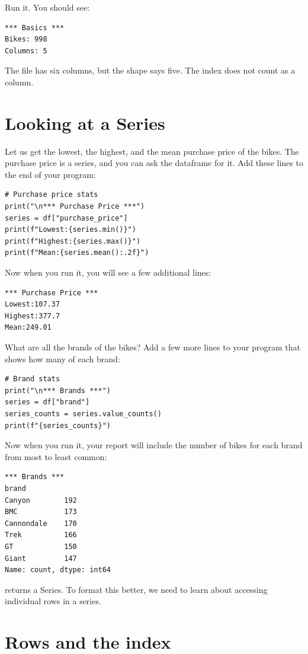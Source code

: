 Run it. You should see:
\begin{verbatim}
*** Basics ***
Bikes: 998
Columns: 5
\end{verbatim}

The file has six columns, but the shape says five. The index does not
count as a column.

\section{Looking at a Series}

Let us get the lowest, the highest, and the mean purchase price of the
bikes.  The purchase price is a series, and you can ask the dataframe
for it. Add these lines to the end of your program:

\begin{verbatim}
# Purchase price stats
print("\n*** Purchase Price ***")
series = df["purchase_price"]
print(f"Lowest:{series.min()}")
print(f"Highest:{series.max()}")
print(f"Mean:{series.mean():.2f}")
\end{verbatim}

Now when you run it, you will see a few additional lines:
\begin{verbatim}
*** Purchase Price ***
Lowest:107.37
Highest:377.7
Mean:249.01
\end{verbatim}

What are all the brands of the bikes? Add a few more lines to your
program that shows how many of each brand:

\begin{verbatim}
# Brand stats
print("\n*** Brands ***")
series = df["brand"]
series_counts = series.value_counts()
print(f"{series_counts}")
\end{verbatim}

Now when you run it, your report will include the number of bikes for
each brand from most to least common:

\begin{verbatim}
*** Brands ***
brand
Canyon        192
BMC           173
Cannondale    170
Trek          166
GT            150
Giant         147
Name: count, dtype: int64
\end{verbatim}

 returns a Series.  To format this better, we
need to learn about accessing individual rows in a series.

\section{Rows and the index}

